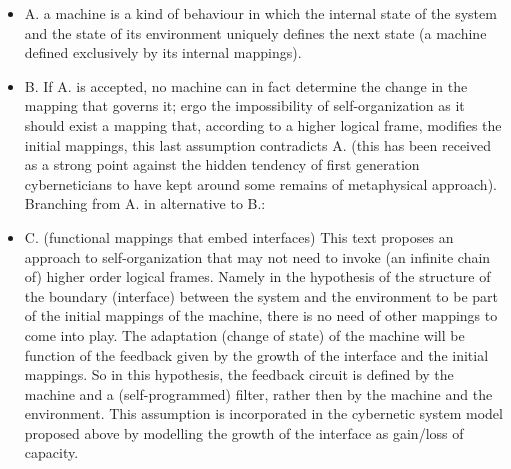\documentclass[14pt]{extarticle}
\begin{document}
\begin{itemize}
\item A. a machine is a kind of behaviour in which the internal state of the system and the state of its environment uniquely defines the next state (a machine defined exclusively by its internal mappings).
\item B. If A. is accepted, no machine can in fact determine the change in the mapping that governs it; ergo the impossibility of self-organization as it should exist a mapping that, according to a higher logical frame, modifies the initial mappings, this last assumption contradicts A. (this has been received as a strong point against the hidden tendency of first generation cyberneticians to have kept around some remains of metaphysical approach).
\newline
\newline
Branching from A. in alternative to B.:
\item C. (functional mappings that embed interfaces) This text proposes an approach to self-organization that may not need to invoke (an infinite chain of) higher order logical frames. Namely in the hypothesis of the structure of the boundary (interface) between the system and the environment to be part of the initial mappings of the machine, there is no need of other mappings to come into play. The adaptation (change of state) of the machine will be function of the feedback given by the growth of the interface and the initial mappings. So in this hypothesis, the feedback circuit is defined by the machine and a (self-programmed) filter, rather then by the machine and the environment. This assumption is incorporated in the cybernetic system model proposed above by modelling the growth of the interface as gain/loss of capacity. 
\end{itemize}
\end{document}
